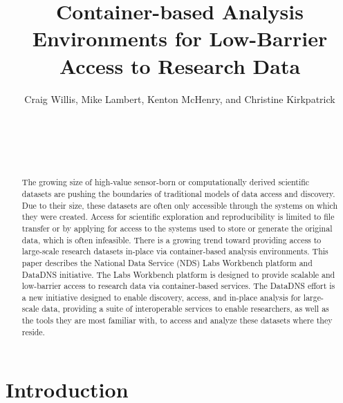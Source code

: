 \documentclass{sig-alternate}
\begin{document}
\sloppy
{}

\author{
Craig Willis, Mike Lambert, Kenton McHenry, and Christine Kirkpatrick\\
     \\
     \\     
     \\
     \\     
}

\title{Container-based Analysis Environments for Low-Barrier Access to Research Data}

\maketitle
\begin{abstract}

The growing size of high-value sensor-born or computationally derived scientific datasets are pushing the boundaries of traditional models of data access and discovery. Due to their size, these datasets are often only accessible through the systems on which they were created. Access for scientific exploration and reproducibility is limited to file transfer or by applying for access to the systems used to store or generate the original data, which is often infeasible. There is a growing trend toward providing access to large-scale research datasets in-place via container-based analysis environments. This paper describes the National Data Service (NDS) Labs Workbench platform and DataDNS initiative. The Labs Workbench platform is designed to provide scalable and low-barrier access to research data via container-based services. The DataDNS effort is a new initiative designed to enable discovery, access, and in-place analysis for large-scale data, providing a suite of interoperable services to enable researchers, as well as the tools they are most familiar with, to access and analyze these datasets where they reside.

\end{abstract}


\keywords{}

\section{Introduction}
\end{document}
